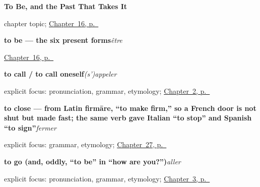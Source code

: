 \noindent\begin{minipage}[t]{\linewidth}
\raggedright
\textbf{To Be, and the Past That Takes It}\par
\footnotesize chapter topic; \hyperref[ch:etre]{Chapter~16, p.~\pageref*{ch:etre}}
\end{minipage}\par\smallskip

\noindent\begin{minipage}[t]{\linewidth}
\raggedright
\textbf{to be — the six present forms}\enspace\emph{être}\par
\footnotesize \hyperref[ch:etre]{Chapter~16, p.~\pageref*{ch:etre}}
\end{minipage}\par\smallskip

\noindent\begin{minipage}[t]{\linewidth}
\raggedright
\textbf{to call / to call oneself}\enspace\emph{(s')appeler}\par
\footnotesize explicit focus: pronunciation, grammar, etymology; \hyperref[ch:introductions]{Chapter~2, p.~\pageref*{ch:introductions}}
\end{minipage}\par\smallskip

\noindent\begin{minipage}[t]{\linewidth}
\raggedright
\textbf{to close — from Latin firmāre, \textquotedblleft{}to make firm,\textquotedblright{} so a French door is not shut but made fast; the same verb gave Italian \textquotedblleft{}to stop\textquotedblright{} and Spanish \textquotedblleft{}to sign\textquotedblright{}}\enspace\emph{fermer}\par
\footnotesize explicit focus: grammar, etymology; \hyperref[ch:fr-sitting-standing-opening-closing]{Chapter~27, p.~\pageref*{ch:fr-sitting-standing-opening-closing}}
\end{minipage}\par\smallskip

\noindent\begin{minipage}[t]{\linewidth}
\raggedright
\textbf{to go (and, oddly, \textquotedblleft{}to be\textquotedblright{} in \textquotedblleft{}how are you?\textquotedblright{})}\enspace\emph{aller}\par
\footnotesize explicit focus: pronunciation, grammar, etymology; \hyperref[ch:how-are-you]{Chapter~3, p.~\pageref*{ch:how-are-you}}
\end{minipage}\par\smallskip

